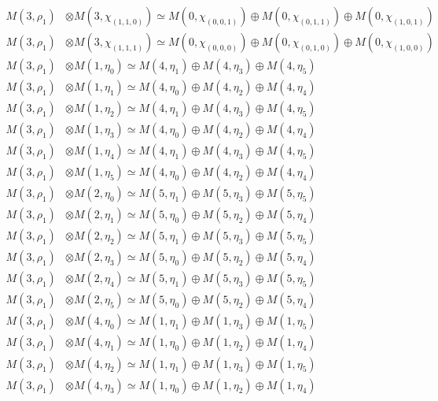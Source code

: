 \begin{align*}
M(3,\rho_{1}) &\otimes M(3,\chi_{(1,1,0)}) \simeq M(0,\chi_{(0,0,1)}) \oplus M(0,\chi_{(0,1,1)}) \oplus M(0,\chi_{(1,0,1)}) \\
M(3,\rho_{1}) &\otimes M(3,\chi_{(1,1,1)}) \simeq M(0,\chi_{(0,0,0)}) \oplus M(0,\chi_{(0,1,0)}) \oplus M(0,\chi_{(1,0,0)}) \\
M(3,\rho_{1}) &\otimes M(1,\eta_{0}) \simeq M(4,\eta_{1}) \oplus M(4,\eta_{3}) \oplus M(4,\eta_{5}) \\
M(3,\rho_{1}) &\otimes M(1,\eta_{1}) \simeq M(4,\eta_{0}) \oplus M(4,\eta_{2}) \oplus M(4,\eta_{4}) \\
M(3,\rho_{1}) &\otimes M(1,\eta_{2}) \simeq M(4,\eta_{1}) \oplus M(4,\eta_{3}) \oplus M(4,\eta_{5}) \\
M(3,\rho_{1}) &\otimes M(1,\eta_{3}) \simeq M(4,\eta_{0}) \oplus M(4,\eta_{2}) \oplus M(4,\eta_{4}) \\
M(3,\rho_{1}) &\otimes M(1,\eta_{4}) \simeq M(4,\eta_{1}) \oplus M(4,\eta_{3}) \oplus M(4,\eta_{5}) \\
M(3,\rho_{1}) &\otimes M(1,\eta_{5}) \simeq M(4,\eta_{0}) \oplus M(4,\eta_{2}) \oplus M(4,\eta_{4}) \\
M(3,\rho_{1}) &\otimes M(2,\eta_{0}) \simeq M(5,\eta_{1}) \oplus M(5,\eta_{3}) \oplus M(5,\eta_{5}) \\
M(3,\rho_{1}) &\otimes M(2,\eta_{1}) \simeq M(5,\eta_{0}) \oplus M(5,\eta_{2}) \oplus M(5,\eta_{4}) \\
M(3,\rho_{1}) &\otimes M(2,\eta_{2}) \simeq M(5,\eta_{1}) \oplus M(5,\eta_{3}) \oplus M(5,\eta_{5}) \\
M(3,\rho_{1}) &\otimes M(2,\eta_{3}) \simeq M(5,\eta_{0}) \oplus M(5,\eta_{2}) \oplus M(5,\eta_{4}) \\
M(3,\rho_{1}) &\otimes M(2,\eta_{4}) \simeq M(5,\eta_{1}) \oplus M(5,\eta_{3}) \oplus M(5,\eta_{5}) \\
M(3,\rho_{1}) &\otimes M(2,\eta_{5}) \simeq M(5,\eta_{0}) \oplus M(5,\eta_{2}) \oplus M(5,\eta_{4}) \\
M(3,\rho_{1}) &\otimes M(4,\eta_{0}) \simeq M(1,\eta_{1}) \oplus M(1,\eta_{3}) \oplus M(1,\eta_{5}) \\
M(3,\rho_{1}) &\otimes M(4,\eta_{1}) \simeq M(1,\eta_{0}) \oplus M(1,\eta_{2}) \oplus M(1,\eta_{4}) \\
M(3,\rho_{1}) &\otimes M(4,\eta_{2}) \simeq M(1,\eta_{1}) \oplus M(1,\eta_{3}) \oplus M(1,\eta_{5}) \\
M(3,\rho_{1}) &\otimes M(4,\eta_{3}) \simeq M(1,\eta_{0}) \oplus M(1,\eta_{2}) \oplus M(1,\eta_{4}) \\

\end{align*}
